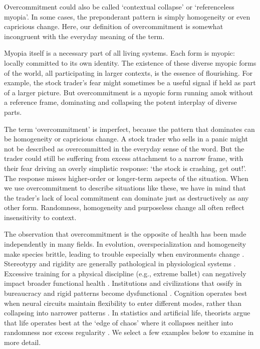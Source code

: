\documentclass[12pt]{article}
\begin{document}
Overcommitment could also be called `contextual collapse' or `referenceless myopia'. In some cases, the preponderant pattern is simply homogeneity or even capricious change. Here, our definition of overcommitment is somewhat incongruent with the everyday meaning of the term.


Myopia itself is a necessary part of all living systems. Each form is myopic: locally committed to its own identity. The existence of these diverse myopic forms of the world, all participating in larger contexts, is the essence of flourishing. For example, the stock trader's fear might sometimes be a useful signal if held as part of a larger picture. But overcommitment is a myopic form running amok without a reference frame, dominating and collapsing the potent interplay of diverse parts. 

The term `overcommitment' is imperfect, because the pattern that dominates can be homogeneity or capricious change. A stock trader who sells in a panic might not be described as overcommitted in the everyday sense of the word. But the trader could still be suffering from excess attachment to a narrow frame, with their fear driving an overly simplistic response: `the stock is crashing, get out!'. The response misses higher-order or longer-term aspects of the situation. When we use overcommitment to describe situations like these, we have in mind that the trader's lack of local commitment can dominate just as destructively as any other form. Randomness, homogeneity and purposeless change all often reflect insensitivity to context. 


  
The observation that overcommitment is the opposite of health has been made independently in many fields. In evolution, overspecialization and homogeneity make species brittle, leading to trouble especially when environments change \citep{van2004cope, simpson1944tempo, yachi1999biodiversity}. Stereotypy and rigidity are generally pathological in physiological systems \citep{canguilhem1966normal, lipsitz1992loss, mackey1977oscillation, sterling1988allostasis}. Excessive training for a physical discipline (e.g., extreme ballet) can negatively impact broader functional health \citep{jayanthi2013sports, warren1986scoliosis}. Institutions and civilizations that ossify in bureaucracy and rigid patterns become dysfunctional \citep{weber1905protestantische, merton1940bureaucratic, olson1982rise}. Cognition operates best when neural circuits maintain flexibility to enter different modes, rather than collapsing into narrower patterns \citep{deco2012ongoing, waschke2021behavior, hellyer2015cognitive}. In statistics and artificial life, theorists argue that life operates best at the `edge of chaos' where it collapses neither into randomness nor excess regularity \citep{langton1990computation,kauffman1993origins, gell1994quark, crutchfield1994calculi}. We select a few examples below to examine in more detail.
\end{document}
